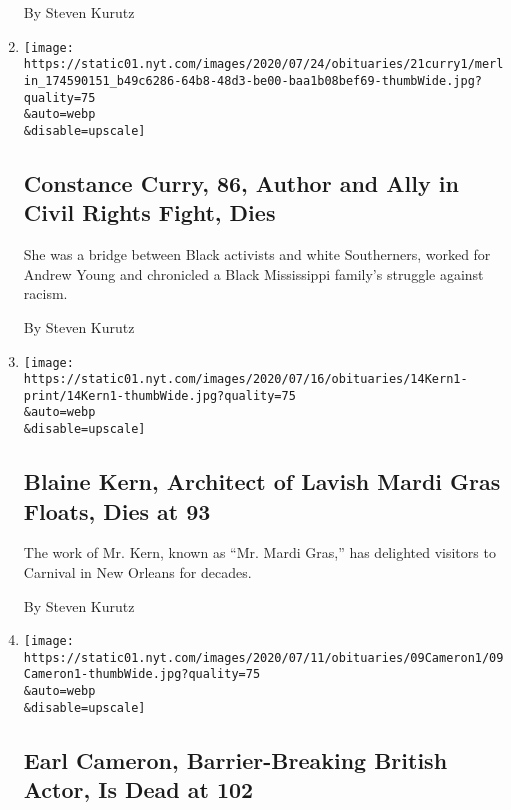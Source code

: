 \begin{enumerate}
  By Steven Kurutz
\item
  \href{/2020/07/22/us/constance-curry-86-author-and-ally-in-civil-rights-fight-dies.html}{}

  \texttt{[image: https://static01.nyt.com/images/2020/07/24/obituaries/21curry1/merlin\_174590151\_b49c6286-64b8-48d3-be00-baa1b08bef69-thumbWide.jpg?quality=75\\\&auto=webp\\\&disable=upscale]}

  \hypertarget{constance-curry-86-author-and-ally-in-civil-rights-fight-dies}{%
  \subsection{Constance Curry, 86, Author and Ally in Civil Rights
  Fight,
  Dies}\label{constance-curry-86-author-and-ally-in-civil-rights-fight-dies}}

  She was a bridge between Black activists and white Southerners, worked
  for Andrew Young and chronicled a Black Mississippi family's struggle
  against racism.

  By Steven Kurutz
\item
  \href{/2020/07/14/us/blaine-kern-dead.html}{}

  \texttt{[image: https://static01.nyt.com/images/2020/07/16/obituaries/14Kern1-print/14Kern1-thumbWide.jpg?quality=75\\\&auto=webp\\\&disable=upscale]}

  \hypertarget{blaine-kern-architect-of-lavish-mardi-gras-floats-dies-at-93}{%
  \subsection{Blaine Kern, Architect of Lavish Mardi Gras Floats, Dies
  at
  93}\label{blaine-kern-architect-of-lavish-mardi-gras-floats-dies-at-93}}

  The work of Mr. Kern, known as ``Mr. Mardi Gras,'' has delighted
  visitors to Carnival in New Orleans for decades.

  By Steven Kurutz
\item
  \href{/2020/07/10/movies/earl-cameron-dead.html}{}

  \texttt{[image: https://static01.nyt.com/images/2020/07/11/obituaries/09Cameron1/09Cameron1-thumbWide.jpg?quality=75\\\&auto=webp\\\&disable=upscale]}

  \hypertarget{earl-cameron-barrier-breaking-british-actor-is-dead-at-102}{%
  \subsection{Earl Cameron, Barrier-Breaking British Actor, Is Dead at
  102}\label{earl-cameron-barrier-breaking-british-actor-is-dead-at-102}}


\end{enumerate}
